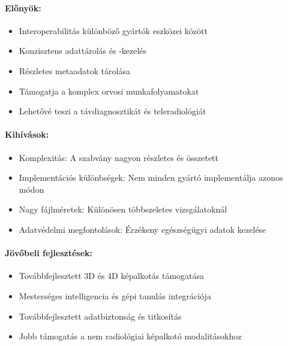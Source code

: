 \documentclass[a4paper,12pt]{article}
\begin{document}
\paragraph{Előnyök:} \begin{itemize} \item Interoperabilitás különböző gyártók eszközei között \item Konzisztens adattárolás és -kezelés \item Részletes metaadatok tárolása \item Támogatja a komplex orvosi munkafolyamatokat \item Lehetővé teszi a távdiagnosztikát és teleradiológiát \end{itemize}

\paragraph{Kihívások:} \begin{itemize} \item Komplexitás: A szabvány nagyon részletes és összetett \item Implementációs különbségek: Nem minden gyártó implementálja azonos módon \item Nagy fájlméretek: Különösen többszeletes vizsgálatoknál \item Adatvédelmi megfontolások: Érzékeny egészségügyi adatok kezelése \end{itemize}

\paragraph{Jövőbeli fejlesztések:} \begin{itemize} \item Továbbfejlesztett 3D és 4D képalkotás támogatása \item Mesterséges intelligencia és gépi tanulás integrációja \item Továbbfejlesztett adatbiztonság és titkosítás \item Jobb támogatás a nem radiológiai képalkotó modalitásokhoz \end{itemize}
\end{document}
